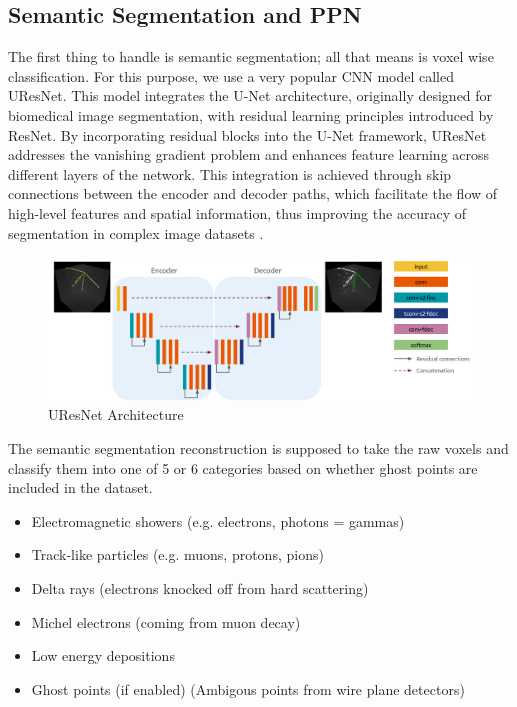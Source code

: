 \subsection{Semantic Segmentation and PPN}

The first thing to handle is semantic segmentation; all that means is  voxel wise classification.
For this purpose, we use a very popular CNN model called UResNet.
This model integrates the U-Net architecture, originally designed for biomedical image segmentation, with residual learning principles introduced by ResNet.
By incorporating residual blocks into the U-Net framework, UResNet addresses the vanishing gradient problem and enhances feature learning across different layers of the network.
This integration is achieved through skip connections between the encoder and decoder paths, which facilitate the flow of high-level features and spatial information, thus improving the accuracy of segmentation in complex image datasets \cite{uresnet_2019}.

\begin{figure}[H]
  \centering
  \includegraphics[width=120mm]{figures/uresnet.png}
  \caption{UResNet Architecture \cite{Drielsma_2024}}
  \label{uresnet}
\end{figure}

The semantic segmentation reconstruction is supposed to take the raw voxels and classify them into one of 5 or 6 categories based on whether ghost points are included in the dataset.

\begin{itemize}
\item Electromagnetic showers (e.g. electrons, photons = gammas)

\item Track-like particles (e.g. muons, protons, pions)

\item Delta rays (electrons knocked off from hard scattering)

\item Michel electrons (coming from muon decay)

\item Low energy depositions

\item Ghost points (if enabled) (Ambigous points from wire plane detectors)

\end{itemize}

